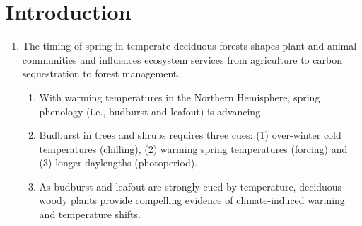 \documentclass{article}\usepackage[]{graphicx}\usepackage[]{color}
\begin{document}
\section*{Introduction}
\begin{enumerate}
\item The timing of spring in temperate deciduous forests shapes plant and animal communities and influences ecosystem services from agriculture to carbon sequestration to forest management.
  \begin{enumerate}
  \item With warming temperatures in the Northern Hemisphere, spring phenology (i.e., budburst and leafout) is advancing.
  \item Budburst in trees and shrubs requires three cues: (1) over-winter cold temperatures (chilling), (2) warming spring temperatures (forcing) and (3) longer daylengths (photoperiod).
  \item As budburst and leafout are strongly cued by temperature, deciduous woody plants provide compelling evidence of climate-induced warming and temperature shifts.
  \end{enumerate}
  

\end{enumerate}
\end{document}
